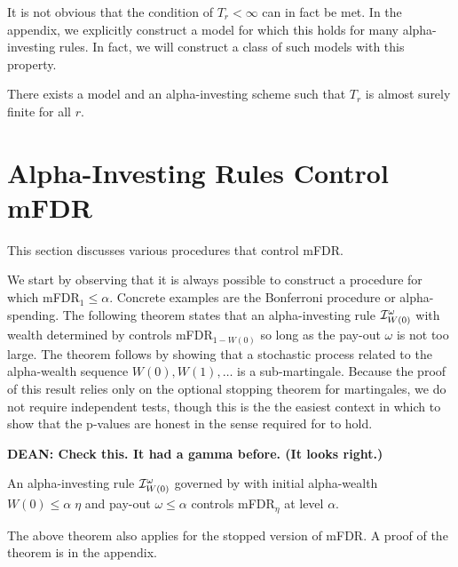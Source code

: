 \documentclass[12pt]{article}
\begin{document}
It is not obvious that the condition of $T_{r} < \infty$ can in
 fact be met.  In the appendix, we explicitly construct a model
 for which this holds for many alpha-investing rules.  In
 fact, we will construct a class of such models with this property.  

\begin{theorem}\label{thm:finite:stopping}
There exists a model and an alpha-investing scheme such that $T_{r}$
 is almost surely finite for all $r$.
\end{theorem}

\section{Alpha-Investing Rules Control mFDR}      \label{sec:results}    %

This section discusses various procedures that control mFDR.    

We start by observing that it is always possible to construct a procedure for which mFDR$_{1} \le \alpha$.  Concrete examples are the Bonferroni procedure or alpha-spending.  The following theorem states that an alpha-investing rule ${\cal
 I}_{W(0)}^{\omega}$ with wealth determined by  controls
 mFDR${}_{1-W(0)}$ so long as the pay-out $\omega$ is not too large.
  The theorem follows by showing that a stochastic process related to
 the alpha-wealth sequence $W(0), W(1), \ldots$ is a sub-martingale.
  Because the proof of this result relies only on the optional
 stopping theorem for martingales, we do not require independent
 tests, though this is the the easiest context in which to
 show that the p-values are honest in the sense required for
  to hold.

{\bf DEAN:  Check this.  It had a gamma before.  (It looks right.) }

\begin{theorem} \label{th:main} An alpha-investing rule ${\cal
 I}_{W(0)}^{\omega}$ governed by  with initial alpha-wealth
 $W(0) \le \alpha \; \eta$ and pay-out $\omega \le \alpha$ controls
 mFDR$_\eta$ at level $\alpha$.
\label{eq:theorem1}
\end{theorem}
The above theorem also applies for the stopped version of mFDR.  A proof of the theorem is in the appendix.

\end{document}
